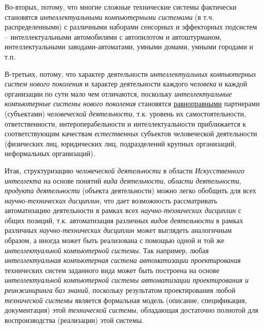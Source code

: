 \begin{textitemize}
	\item
	Во-вторых, потому, что многие сложные технические системы фактически становятся \textit{интеллектуальными компьютерными системами} (в т.ч. распределенными) с различными наборами сенсорных и эффекторных подсистем -- интеллектуальными автомобилями с автопилотом и автоштурманом, интеллектуальными заводами-автоматами, умными домами, умными городами и т.п.
	\item
	В-третьих, потому, что характер деятельности \textit{интеллектуальных компьютерных систем нового поколения} и характер деятельности каждого \textit{человека} и каждой организации по сути мало чем отличаются, поскольку \textit{интеллектуальные компьютерные системы нового поколения} становятся \underline{равноправными} партнерами (субъектами) \textit{человеческой деятельности}, т.к. уровень их самостоятельности, ответственности, интероперабельности и интеллектуальности приближается к соответствующим качествам \textit{естественных} субъектов человеческой деятельности (физических лиц, юридических лиц, подразделений крупных организаций, неформальных организаций).
\end{textitemize}

Итак, структуризацию \textit{человеческой деятельности} в области \textit{Искусственного интеллекта} на основе понятий \textit{вида деятельности}, \textit{области деятельности}, \textit{продукта деятельности} (объекта деятельности) можно легко обобщить для всех \textit{научно-технических дисциплин}, что дает возможность рассматривать автоматизацию деятельности в рамках всех \textit{научно-технических дисциплин} с общих позиций, т.к. автоматизация различных \textit{видов деятельности} в рамках различных \textit{научно-технических дисциплин} может выглядеть аналогичным образом, а иногда может быть реализована с помощью одной и той же \textit{интеллектуальной компьютерной системы}. Так например, любая \textit{интеллектуальная компьютерная система автоматизации проектирования} технических систем заданного вида может быть построена на основе \textit{интеллектуальной компьютерной системы автоматизации проектирования и реинжиниринга баз знаний}, поскольку результатом проектирования любой \textit{технической системы} является формальная модель (описание, спецификация, документация) этой \textit{технической системы}, обладающая достаточно полнотой для воспроизводства (реализации) этой системы.

